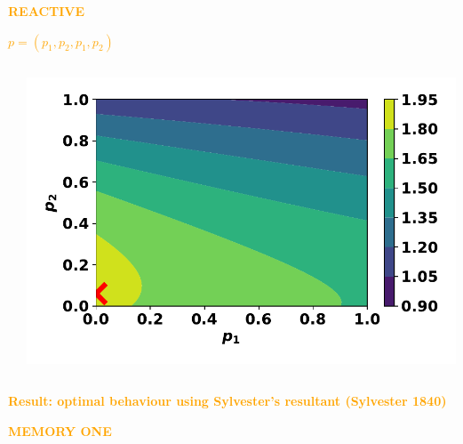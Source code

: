\documentclass{beamer}
\begin{document}
\begin{frame}
    \begin{center}
    \Large{
    \textbf{\textcolor{orange}{REACTIVE}} \vspace{1cm}

    \textcolor{orange}{\boldmath\( p = (p_1, p_2, p_1, p_2)\)}}
    \end{center}
\end{frame}

\begin{frame}
    \begin{columns}
        \begin{column}{.5\textwidth}
            
        \end{column}
        \begin{column}{.5\textwidth}
            \includegraphics[width=\textwidth]{reactive_pairwise_one}
        \end{column}
    \end{columns}
    \pause
    \centering
    \vspace{2mm}
    \textbf{\textcolor{orange}{Result: optimal behaviour using Sylvester's resultant (Sylvester 1840)}}
\end{frame}

\begin{frame}
    \begin{center}
    \Large{
    \textbf{\textcolor{orange}{MEMORY ONE}}}
    \end{center}
\end{frame}
\end{document}
